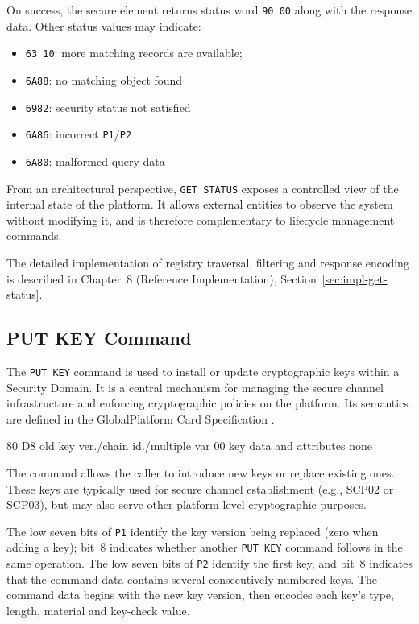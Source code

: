 On success, the secure element returns status word \texttt{90 00} along with the response
data.  Other status values may indicate:
\begin{itemize}
\item \texttt{63 10}: more matching records are available;
\item \texttt{6A88}: no matching object found
\item \texttt{6982}: security status not satisfied
\item \texttt{6A86}: incorrect \texttt{P1}/\texttt{P2}
\item \texttt{6A80}: malformed query data
\end{itemize}

From an architectural perspective, \texttt{GET STATUS} exposes a controlled
view of the internal state of the platform. It allows external entities to
observe the system without modifying it, and is therefore complementary to
lifecycle management commands.

The detailed implementation of registry traversal, filtering and response
encoding is described in Chapter~8 (Reference Implementation),
Section~\ref{sec:impl-get-status}.

\subsection{PUT KEY Command}

The \texttt{PUT KEY} command is used to install or update cryptographic keys within a
Security Domain. It is a central mechanism for managing the secure channel infrastructure
and enforcing cryptographic policies on the platform. Its semantics are defined in the
GlobalPlatform Card Specification .

\apdudesc
{80}
{D8}
{old key ver./chain}
{id./multiple}
{var}
{00}
{key data and attributes}
{none}

The command allows the caller to introduce new keys or replace existing ones. These keys
are typically used for secure channel establishment (e.g., SCP02 or SCP03), but may also
serve other platform-level cryptographic purposes.

The low seven bits of \texttt{P1} identify the key version being replaced (zero
when adding a key); bit~8 indicates whether another \texttt{PUT KEY} command
follows in the same operation. The low seven bits of \texttt{P2} identify the
first key, and bit~8 indicates that the command data contains several
consecutively numbered keys. The command data begins with the new key version,
then encodes each key's type, length, material and key-check value.

